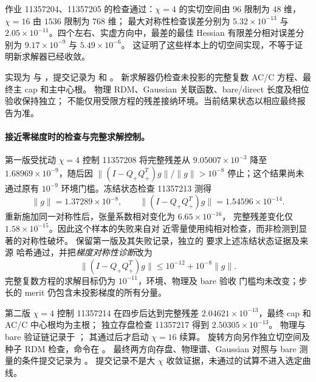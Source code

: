 作业 11357204、11357205 的检查通过：$\chi=4$ 的实切空间由
$96$ 限制为 $48$ 维，$\chi=16$ 由 $1536$ 限制为 $768$ 维；
最大对称性检查误差分别为 $5.32\times10^{-13}$ 与
$2.05\times10^{-11}$。四个左右、实虚方向中，最差的最佳 Hessian
有限差分相对误差分别为 $9.17\times10^{-9}$ 与 $5.49\times10^{-6}$。
这证明了这些样本上的切空间实现，不等于证明新求解器已经收敛。

实现为  与
，提交记录为
 和
。
新求解器仍检查未投影的完整复数 AC/C 方程、最终主 cap 和主中心根。
物理 RDM、Gaussian 关联函数、bare/direct 长度及相位验收保持独立；
不能仅用受限方程的残差接纳环境。当前结果状态以相应最终报告为准。

\paragraph{接近零梯度时的检查与完整求解控制。}
第一版受扰动 $\chi=4$ 控制 11357208 将完整残差从
$9.05007\times10^{-3}$ 降至 $1.68969\times10^{-9}$，随后因
$\|(I-Q_+Q_+^T)g\|/\|g\|>10^{-8}$ 停止；这个结果尚未通过原有
$10^{-9}$ 环境门槛。冻结状态检查 11357213 测得
\begin{equation}
 \|g\|=1.37289\times10^{-8},\qquad
 \|(I-Q_+Q_+^T)g\|=1.54596\times10^{-14}.
\end{equation}
重新施加同一对称性后，张量系数相对变化为 $6.65\times10^{-16}$，
完整残差变化仅 $1.58\times10^{-15}$。因此这个样本的失败来自对
近零量使用纯相对检查，而非检测到显著的对称性破坏。
保留第一版及其失败记录，独立的
 要求上述冻结状态证据及来源
哈希通过，并把\emph{梯度对称性诊断}改为
\begin{equation}
 \|(I-Q_+Q_+^T)g\|\leq 10^{-12}+10^{-8}\|g\|.
\end{equation}
完整复数方程的求解目标仍为 $10^{-11}$，环境、物理及 bare 验收
门槛均未改变；步长的 merit 仍包含未投影梯度的所有分量。

第二版 $\chi=4$ 控制 11357214 在四步后达到完整残差
$2.04621\times10^{-13}$，最终 cap 和 AC/C 中心根均为主根；
独立存盘检查 11357217 得到 $2.50305\times10^{-13}$。
物理与 bare 验证链记录于
；
其通过后才启动 $\chi=16$ 续算。
旋转方向另作独立切空间及种子 RDM 检查，命令在
。
最终两方向存盘、物理谱、Gaussian 对照与 bare 测量的条件提交记录为
。
提交记录不是大 $\chi$ 收敛证据，未通过的试算不进入选定曲线。

